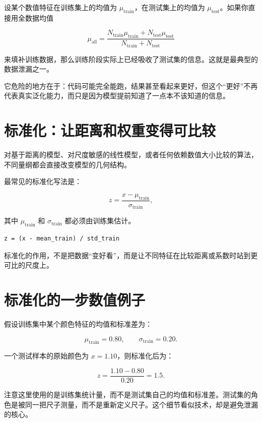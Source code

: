 设某个数值特征在训练集上的均值为 $\mu_{\mathrm{train}}$，在测试集上的均值为 $\mu_{\mathrm{test}}$。如果你直接用全数据均值

\[
\mu_{\mathrm{all}} =
\frac{N_{\mathrm{train}}\mu_{\mathrm{train}} + N_{\mathrm{test}}\mu_{\mathrm{test}}}
{N_{\mathrm{train}} + N_{\mathrm{test}}}
\]

来填补训练数据，那么训练阶段实际上已经吸收了测试集的信息。这就是最典型的数据泄漏之一。

它危险的地方在于：代码可能完全能跑，结果甚至看起来更好，但这个“更好”不再代表真实泛化能力，而只是因为模型提前知道了一点本不该知道的信息。

\section{标准化：让距离和权重变得可比较}

对基于距离的模型、对尺度敏感的线性模型，或者任何依赖数值大小比较的算法，不同量纲都会直接改变模型的几何结构。

最常见的标准化写法是：

\[
z = \frac{x - \mu_{\mathrm{train}}}{\sigma_{\mathrm{train}}},
\]

其中 $\mu_{\mathrm{train}}$ 和 $\sigma_{\mathrm{train}}$ 都必须由训练集估计。

\begin{examplebox}[标准化的直觉]
\begin{lstlisting}[style=pythonstyle]
z = (x - mean_train) / std_train
\end{lstlisting}
\end{examplebox}

标准化的作用，不是把数据“变好看”，而是让不同特征在比较距离或系数时站到更可比的尺度上。

\section{标准化的一步数值例子}

假设训练集中某个颜色特征的均值和标准差为：

\[
\mu_{\mathrm{train}}=0.80,\qquad \sigma_{\mathrm{train}}=0.20.
\]

一个测试样本的原始颜色为 $x=1.10$，则标准化后为：

\[
z=\frac{1.10-0.80}{0.20}=1.5.
\]

注意这里使用的是训练集统计量，而不是测试集自己的均值和标准差。测试集的角色是被同一把尺子测量，而不是重新定义尺子。这个细节看似技术，却是避免泄漏的核心。

